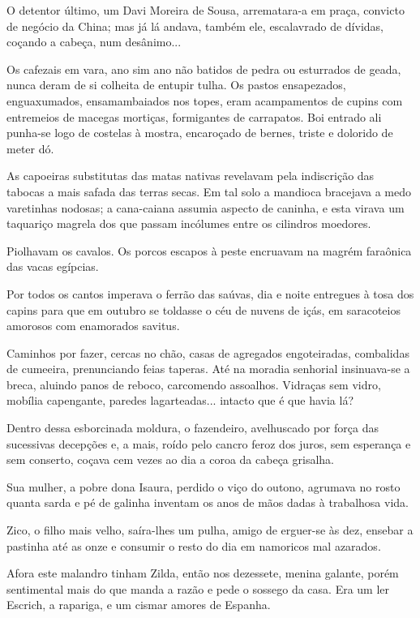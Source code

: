 O detentor último, um Davi Moreira de Sousa, arrematara-a em praça,
convicto de negócio da China; mas já lá andava, também ele, escalavrado
de dívidas, coçando a cabeça, num desânimo...

Os cafezais em vara, ano sim ano não batidos de pedra ou esturrados de
geada, nunca deram de si colheita de entupir tulha. Os pastos
ensapezados, enguaxumados, ensamambaiados nos topes, eram acampamentos
de cupins com entremeios de macegas mortiças, formigantes de carrapatos.
Boi entrado ali punha-se logo de costelas à mostra, encaroçado de
bernes, triste e dolorido de meter dó.

As capoeiras substitutas das matas nativas revelavam pela indiscrição
das tabocas a mais safada das terras secas. Em tal solo a mandioca
bracejava a medo varetinhas nodosas; a cana-caiana assumia aspecto de
caninha, e esta virava um taquariço magrela dos que passam incólumes
entre os cilindros moedores.

Piolhavam os cavalos. Os porcos escapos à peste encruavam na magrém
faraônica das vacas egípcias.

Por todos os cantos imperava o ferrão das saúvas, dia e noite entregues
à tosa dos capins para que em outubro se toldasse o céu de nuvens de
içás, em saracoteios amorosos com enamorados savitus.

Caminhos por fazer, cercas no chão, casas de agregados engoteiradas,
combalidas de cumeeira, prenunciando feias taperas. Até na moradia
senhorial insinuava-se a breca, aluindo panos de reboco, carcomendo
assoalhos. Vidraças sem vidro, mobília capengante, paredes
lagarteadas... intacto que é que havia lá?

Dentro dessa esborcinada moldura, o fazendeiro, avelhuscado por força
das sucessivas decepções e, a mais, roído pelo cancro feroz dos juros,
sem esperança e sem conserto, coçava cem vezes ao dia a coroa da cabeça
grisalha.

Sua mulher, a pobre dona Isaura, perdido o viço do outono, agrumava no
rosto quanta sarda e pé de galinha inventam os anos de mãos dadas à
trabalhosa vida.

Zico, o filho mais velho, saíra-lhes um pulha, amigo de erguer-se às
dez, ensebar a pastinha até as onze e consumir o resto do dia em
namoricos mal azarados.

Afora este malandro tinham Zilda, então nos dezessete, menina galante,
porém sentimental mais do que manda a razão e pede o sossego da casa.
Era um ler Escrich, a rapariga, e um cismar amores de Espanha.

